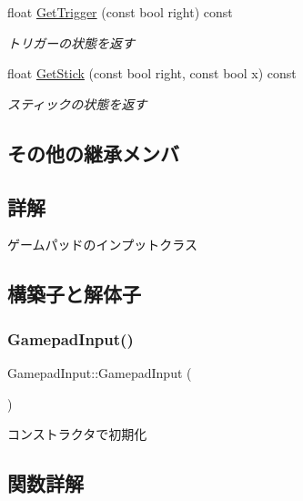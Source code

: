 \begin{DoxyCompactItemize}
float \mbox{\hyperlink{class_gamepad_input_aab528f55fe651996096e697acdec4546}{Get\+Trigger}} (const bool right) const
\begin{DoxyCompactList}\small\item\em トリガーの状態を返す \end{DoxyCompactList}\item 
float \mbox{\hyperlink{class_gamepad_input_ab7e3fb80f81fcafdfc7c0f546c280929}{Get\+Stick}} (const bool right, const bool x) const
\begin{DoxyCompactList}\small\item\em スティックの状態を返す \end{DoxyCompactList}\end{DoxyCompactItemize}
\subsection*{その他の継承メンバ}


\subsection{詳解}
ゲームパッドのインプットクラス 

\subsection{構築子と解体子}
\mbox{\label{class_gamepad_input_acd9878326e438f379020827d63ebd6cf}} 
\subsubsection{\texorpdfstring{Gamepad\+Input()}{GamepadInput()}}
{\footnotesize\ttfamily Gamepad\+Input\+::\+Gamepad\+Input (\begin{DoxyParamCaption}{ }\end{DoxyParamCaption})}



コンストラクタで初期化 



\subsection{関数詳解}
\mbox{\label{class_gamepad_input_a73a45e377ebcd58b6f0462d6d8fbcb94}} 
